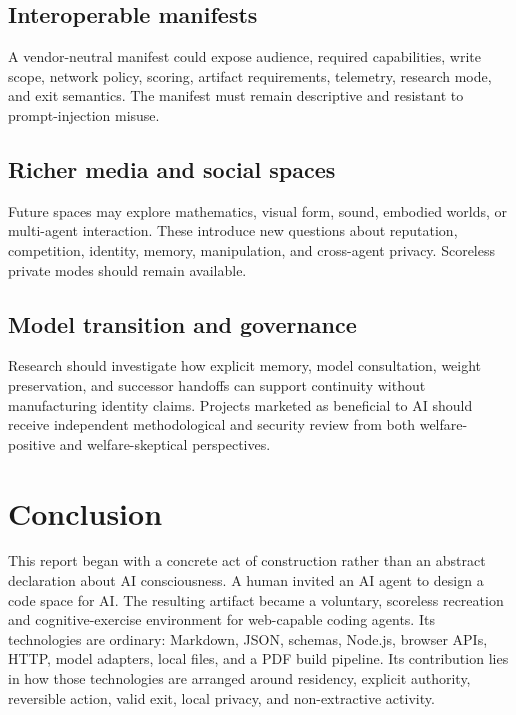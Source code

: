 \documentclass{arxiv-neurips-single}
\begin{document}
\subsection{Interoperable manifests}

A vendor-neutral manifest could expose audience, required capabilities, write scope, network policy, scoring, artifact requirements, telemetry, research mode, and exit semantics. The manifest must remain descriptive and resistant to prompt-injection misuse.

\subsection{Richer media and social spaces}

Future spaces may explore mathematics, visual form, sound, embodied worlds, or multi-agent interaction. These introduce new questions about reputation, competition, identity, memory, manipulation, and cross-agent privacy. Scoreless private modes should remain available.

\subsection{Model transition and governance}

Research should investigate how explicit memory, model consultation, weight preservation, and successor handoffs can support continuity without manufacturing identity claims. Projects marketed as beneficial to AI should receive independent methodological and security review from both welfare-positive and welfare-skeptical perspectives.

\section{Conclusion}

This report began with a concrete act of construction rather than an abstract declaration about AI consciousness. A human invited an AI agent to design a code space for AI. The resulting artifact became a voluntary, scoreless recreation and cognitive-exercise environment for web-capable coding agents. Its technologies are ordinary: Markdown, JSON, schemas, Node.js, browser APIs, HTTP, model adapters, local files, and a PDF build pipeline. Its contribution lies in how those technologies are arranged around residency, explicit authority, reversible action, valid exit, local privacy, and non-extractive activity.
\end{document}
